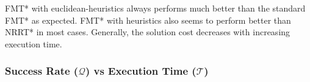 \documentclass{article}
\begin{document}
FMT* with euclidean-heuristics always performs much better than the standard FMT* as expected. FMT* with heuristics also seems to perform better than NRRT* in most cases. Generally, the solution cost decreases with increasing execution time.

\subsubsection{Success Rate ($\mathcal{Q}$) vs Execution Time ($\mathcal{T}$)}

\begin{figure}[H]
\end{figure}
\end{document}

